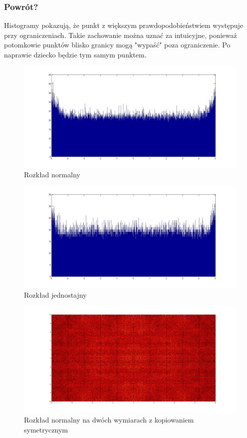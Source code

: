 \documentclass{mini}
\begin{document}
\subsubsection*{Powrót?}
Histogramy pokazują, że punkt z większym prawdopodobieństwiem występuje przy ograniczeniach. Takie zachowanie można uznać za intuicyjne, ponieważ potomkowie punktów blisko granicy mogą "wypaść" poza ograniczenie. Po naprawie dziecko będzie tym samym punktem.
\begin{figure}[H]
\centering
\includegraphics[width=\textwidth]{c_n_20M_1__5_5_2}
\caption{Rozkład normalny}
\end{figure}

\begin{figure}[H]
\centering
\includegraphics[width=\textwidth]{c_j_2M_1__5_5}
\caption{Rozkład jednostajny}
\end{figure}

\begin{figure}[H]
\centering
\includegraphics[width=\textwidth]{c_n_10M_2__20_20__10_10_4}
\caption{Rozkład normalny na dwóch wymiarach z kopiowaniem symetrycznym}
\end{figure}
\end{document}
